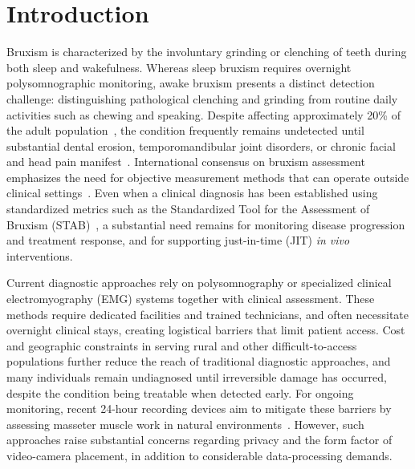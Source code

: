 \documentclass[pdflatex,sn-nature,iicol]{sn-jnl}
\begin{document}
\maketitle


\section{Introduction}

Bruxism is characterized by the involuntary grinding or clenching of teeth during both sleep and wakefulness. Whereas sleep bruxism requires overnight polysomnographic monitoring, awake bruxism presents a distinct detection challenge: distinguishing pathological clenching and grinding from routine daily activities such as chewing and speaking. Despite affecting approximately 20\% of the adult population~\cite{manfredini2013epidemiology}, the condition frequently remains undetected until substantial dental erosion, temporomandibular joint disorders, or chronic facial and head pain manifest~\cite{lavigne2008bruxism}. International consensus on bruxism assessment emphasizes the need for objective measurement methods that can operate outside clinical settings~\cite{lobbezoo2018international}. Even when a clinical diagnosis has been established using standardized metrics such as the Standardized Tool for the Assessment of Bruxism (STAB)~\cite{manfredini2024standardised}, a substantial need remains for monitoring disease progression and treatment response, and for supporting just-in-time (JIT) \textit{in vivo} interventions.

Current diagnostic approaches rely on polysomnography or specialized clinical electromyography (EMG) systems together with clinical assessment. These methods require dedicated facilities and trained technicians, and often necessitate overnight clinical stays, creating logistical barriers that limit patient access. Cost and geographic constraints in serving rural and other difficult-to-access populations further reduce the reach of traditional diagnostic approaches, and many individuals remain undiagnosed until irreversible damage has occurred, despite the condition being treatable when detected early. For ongoing monitoring, recent 24-hour recording devices aim to mitigate these barriers by assessing masseter muscle work in natural environments~\cite{colonna2023electromyographic}. However, such approaches raise substantial concerns regarding privacy and the form factor of video-camera placement, in addition to considerable data-processing demands.
\end{document}

